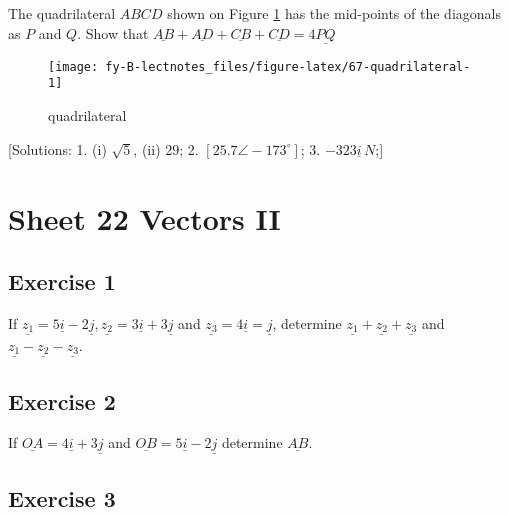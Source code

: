 \documentclass[
  11pt,
  oneside]{book}
\newcommand{\slide}{}
\theoremstyle{definition}
\theoremstyle{definition}
\theoremstyle{definition}
\theoremstyle{definition}
\theoremstyle{remark}
\begin{document}
The quadrilateral \(ABCD\) shown on Figure \ref{fig:67-quadrilateral} has the mid-points of the diagonals as \(P\) and \(Q\). Show that \(\underline{AB}+\underline{AD}+\underline{CB}+\underline{CD} = 4\underline{PQ}\)

\begin{figure}

{\centering \texttt{[image: fy-B-lectnotes\_files/figure-latex/67-quadrilateral-1]} 

}

\caption{quadrilateral}\label{fig:67-quadrilateral}
\end{figure}

{[}Solutions:
1. (i) \(\sqrt{5}\), (ii) \(29\);
2. \([25.7 \angle -173^{\circ}]\);
3. \(-323\underline{i}\,N\);{]}

\slide

\section{Sheet 22 Vectors II}\label{sheet-22-vectors-ii}

\subsection*{Exercise 1}\label{exercise-1-13}

If \(\underline{z_1} = 5\underline{i}-2\underline{j}, \underline{z_2} = 3\underline{i}+3\underline{j}\) and \(\underline{z_3}=4\underline{i}=\underline{j}\), determine \(\underline{z_1}+\underline{z_2}+\underline{z_3}\) and \(\underline{z_1}-\underline{z_2}-\underline{z_3}\).

\slide

\subsection*{Exercise 2}\label{exercise-2-13}

If \(\underline{OA}=4\underline{i}+3\underline{j}\) and \(\underline{OB}=5\underline{i}-2\underline{j}\) determine \(\underline{AB}\).

\slide

\subsection*{Exercise 3}\label{exercise-3-11}
\end{document}

